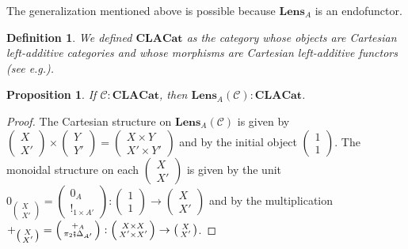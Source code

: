 \documentclass[11pt,a4paper,openright,twoside]{report}
\newcounter{mycounter}
\theoremstyle{plain}
\newtheorem{proposition}[mycounter]{Proposition}
\newtheorem{definition}[mycounter]{Definition}
\theoremstyle{definition}
\begin{document}
The generalization mentioned above is possible because $\mathbf{Lens}_A$ is an endofunctor.

\begin{definition}
  We defined $\mathbf{CLACat}$ as the category whose objects are Cartesian left-additive categories and whose morphisms are Cartesian left-additive functors (see e.g.\cite{blute2006differential}).
\end{definition}

\begin{proposition}
  If $\mathcal{C} : \mathbf{CLACat}$, then $\mathbf{Lens}_A(\mathcal{C}) : \mathbf{CLACat}$.
\end{proposition}
\begin{proof}
  The Cartesian structure on $\mathbf{Lens}_A(\mathcal{C})$ is given by $\left(\begin{smallmatrix}X \\ X'\end{smallmatrix}\right) \times \left(\begin{smallmatrix}Y \\ Y'\end{smallmatrix}\right) = \left(\begin{smallmatrix}X\times Y \\ X' \times Y'\end{smallmatrix}\right)$ and by the initial object $\left(\begin{smallmatrix}1 \\ 1\end{smallmatrix}\right)$. The monoidal structure on each $\left(\begin{smallmatrix}X \\ X'\end{smallmatrix}\right)$ is given by the unit $0_{\left(\begin{smallmatrix}X \\ X'\end{smallmatrix}\right)} = \left(\begin{smallmatrix}0_A \\ !_{1 \times A'}\end{smallmatrix}\right): \left(\begin{smallmatrix}1 \\ 1\end{smallmatrix}\right) \to \left(\begin{smallmatrix}X \\ X'\end{smallmatrix}\right)$ and by the multiplication $+_{\left(\begin{smallmatrix}X \\ X'\end{smallmatrix}\right)} = \left(\begin{smallmatrix}+_A \\ \pi_2 \fatsemi \Delta_{A'}\end{smallmatrix}\right): \left(\begin{smallmatrix}X \times X \\ X' \times X'\end{smallmatrix}\right) \to \left(\begin{smallmatrix}X \\ X'\end{smallmatrix}\right)$.

\end{proof}
\end{document}
